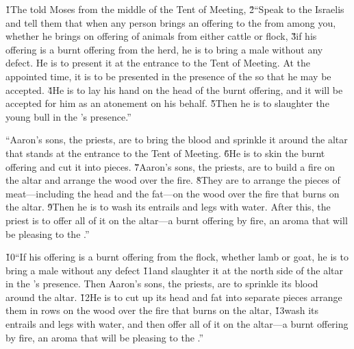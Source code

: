 


\v{1}The  told Moses from the middle of the Tent of Meeting, \v{2}``Speak to the Israelis and tell them that when any person brings an offering to the  from among you, whether he brings on offering of animals from either cattle or flock, \v{3}if his offering is a burnt offering from the herd, he is to bring a male without any defect. He is to present it at the entrance to the Tent of Meeting. At the appointed time, it is to be presented in the presence of the  so that he may be accepted. \v{4}He is to lay his hand on the head of the burnt offering, and it will be accepted for him as an atonement on his behalf. \v{5}Then he is to slaughter the young bull in the 's presence.''

``Aaron's sons, the priests, are to bring the blood and sprinkle it around the altar that stands at the entrance to the Tent of Meeting. \v{6}He is to skin the burnt offering and cut it into pieces. \v{7}Aaron's sons, the priests, are to build a fire on the altar and arrange the wood over the fire. \v{8}They are to arrange the pieces of meat---including the head and the fat---on the wood over the fire that burns on the altar. \v{9}Then he is to wash its entrails and legs with water. After this, the priest is to offer all of it on the altar---a burnt offering by fire, an aroma that will be pleasing to the .''

\v{10}``If his offering is a burnt offering from the flock, whether lamb or goat, he is to bring a male without any defect \v{11}and slaughter it at the north side of the altar in the 's presence. Then Aaron's sons, the priests, are to sprinkle its blood around the altar. \v{12}He is to cut up its head and fat into separate pieces arrange them in rows on the wood over the fire that burns on the altar, \v{13}wash its entrails and legs with water, and then offer all of it on the altar---a burnt offering by fire, an aroma that will be pleasing to the .''

